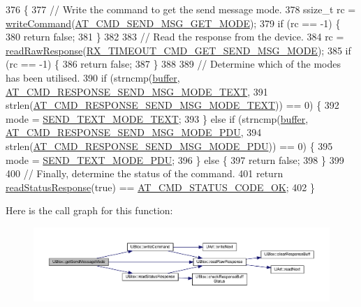 \begin{DoxyCode}
376 \{
377     \textcolor{comment}{// Write the command to get the send message mode.}
378     ssize\_t rc = \hyperlink{class_u_blox_af604d1897a66192bf1c2a11997f2634d}{writeCommand}(\hyperlink{_u_blox_8cpp_a93c42ef646fa4bf7dcef597278717e1d}{AT\_CMD\_SEND\_MSG\_GET\_MODE});
379     \textcolor{keywordflow}{if} (rc == -1) \{
380         \textcolor{keywordflow}{return} \textcolor{keyword}{false};
381     \}
382 
383     \textcolor{comment}{// Read the response from the device.}
384     rc = \hyperlink{class_u_blox_ab4a7ab4b8922d91e23f273ae160c1bed}{readRawResponse}(\hyperlink{_u_blox_8cpp_a0d3650f2c57519450b5d94f5783dd9e8}{RX\_TIMEOUT\_CMD\_GET\_SEND\_MSG\_MODE});
385     \textcolor{keywordflow}{if} (rc == -1) \{
386         \textcolor{keywordflow}{return} \textcolor{keyword}{false};
387     \}
388 
389     \textcolor{comment}{// Determine which of the modes has been utilised.}
390     \textcolor{keywordflow}{if} (strncmp(\hyperlink{class_u_blox_a6ca4b90f3dc4e856181dce1ebda6f82c}{buffer}, \hyperlink{_u_blox_8cpp_abcee20eed819eab289d6b0d8b0af185d}{AT\_CMD\_RESPONSE\_SEND\_MSG\_MODE\_TEXT},
391                 strlen(\hyperlink{_u_blox_8cpp_abcee20eed819eab289d6b0d8b0af185d}{AT\_CMD\_RESPONSE\_SEND\_MSG\_MODE\_TEXT})) == 0) \{
392         mode = \hyperlink{_u_blox_8h_a4fdc1adf2ea333d6490119160a35401a}{SEND\_TEXT\_MODE\_TEXT};
393     \} \textcolor{keywordflow}{else} \textcolor{keywordflow}{if} (strncmp(\hyperlink{class_u_blox_a6ca4b90f3dc4e856181dce1ebda6f82c}{buffer}, \hyperlink{_u_blox_8cpp_a6af49f58e2fffa15f34ee986afc28ef1}{AT\_CMD\_RESPONSE\_SEND\_MSG\_MODE\_PDU},
394                        strlen(\hyperlink{_u_blox_8cpp_a6af49f58e2fffa15f34ee986afc28ef1}{AT\_CMD\_RESPONSE\_SEND\_MSG\_MODE\_PDU})) == 0) \{
395         mode = \hyperlink{_u_blox_8h_a710349e6aa9dc432a71590c80ce184b1}{SEND\_TEXT\_MODE\_PDU};
396     \} \textcolor{keywordflow}{else} \{
397         \textcolor{keywordflow}{return} \textcolor{keyword}{false};
398     \}
399 
400     \textcolor{comment}{// Finally, determine the status of the command.}
401     \textcolor{keywordflow}{return} \hyperlink{class_u_blox_a4eaca5b1b1c4b5b6f6164b220dd43e0b}{readStatusResponse}(\textcolor{keyword}{true}) == \hyperlink{_u_blox_8cpp_a6ebc1682eb6b9964fccb4a61688ff307}{AT\_CMD\_STATUS\_CODE\_OK};
402 \}
\end{DoxyCode}
Here is the call graph for this function\+:
\nopagebreak
\begin{figure}[H]
\begin{center}
\leavevmode
\includegraphics[width=350pt]{da/df6/class_u_blox_aee30d82dcf52335d19f77e766db78ab4_cgraph}
\end{center}
\end{figure}
